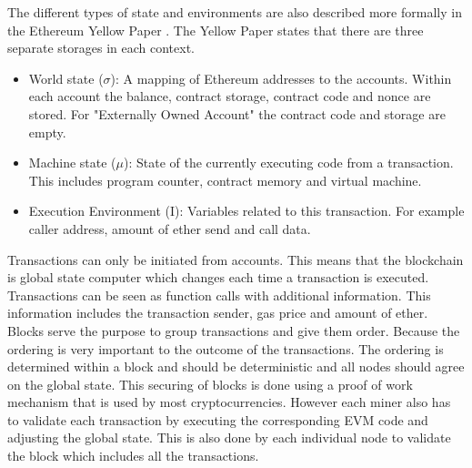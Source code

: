 \documentclass[a4paper]{article}
\begin{document}
The different types of state and environments are also described more formally in the Ethereum Yellow Paper \cite{wood2014ethereum}. The Yellow Paper states that there are three separate storages in each context.
\begin{itemize}
    \item World state ($\sigma$): A mapping of Ethereum addresses to the accounts. Within each account the balance, contract storage, contract code and nonce are stored. For "Externally Owned Account" the contract code and storage are empty.
    \item  Machine state ($\mu$): State of the currently executing code from a transaction. This includes program counter, contract memory and virtual machine.
    \item Execution Environment (I): Variables related to this transaction. For example caller address, amount of ether send and call data.
\end{itemize}
Transactions can only be initiated from accounts. This means that the blockchain is global state computer which changes each time a transaction is executed. Transactions can be seen as function calls with additional information. This information includes the transaction sender, gas price and amount of ether.\\
Blocks serve the purpose to group transactions and give them order. Because the ordering is very important to the outcome of the transactions. The ordering is determined within a block and should be deterministic and all nodes should agree on the global state. This securing of blocks is done using a proof of work mechanism that is used by most cryptocurrencies. However each miner also has to validate each transaction by executing the corresponding EVM code and adjusting the global state. This is also done by each individual node to validate the block which includes all the transactions.
\end{document}
